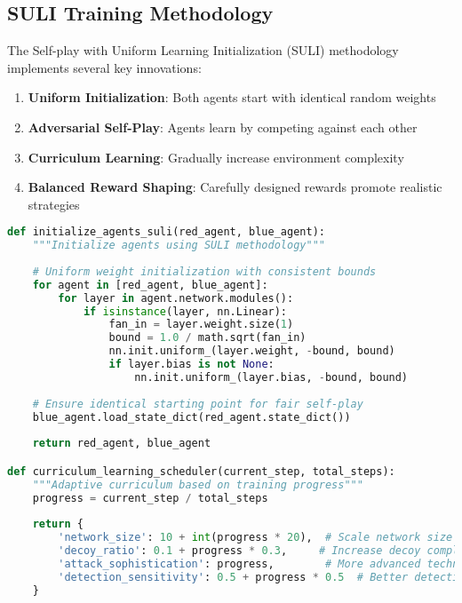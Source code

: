 \documentclass[12pt,a4paper]{article}
\begin{document}
\subsection{SULI Training Methodology}

The Self-play with Uniform Learning Initialization (SULI) methodology implements several key innovations:

\begin{enumerate}
    \item \textbf{Uniform Initialization}: Both agents start with identical random weights
    \item \textbf{Adversarial Self-Play}: Agents learn by competing against each other
    \item \textbf{Curriculum Learning}: Gradually increase environment complexity
    \item \textbf{Balanced Reward Shaping}: Carefully designed rewards promote realistic strategies
\end{enumerate}

\begin{lstlisting}[language=Python, caption=SULI Implementation Details]
def initialize_agents_suli(red_agent, blue_agent):
    """Initialize agents using SULI methodology"""
    
    # Uniform weight initialization with consistent bounds
    for agent in [red_agent, blue_agent]:
        for layer in agent.network.modules():
            if isinstance(layer, nn.Linear):
                fan_in = layer.weight.size(1)
                bound = 1.0 / math.sqrt(fan_in)
                nn.init.uniform_(layer.weight, -bound, bound)
                if layer.bias is not None:
                    nn.init.uniform_(layer.bias, -bound, bound)
    
    # Ensure identical starting point for fair self-play
    blue_agent.load_state_dict(red_agent.state_dict())
    
    return red_agent, blue_agent

def curriculum_learning_scheduler(current_step, total_steps):
    """Adaptive curriculum based on training progress"""
    progress = current_step / total_steps
    
    return {
        'network_size': 10 + int(progress * 20),  # Scale network size
        'decoy_ratio': 0.1 + progress * 0.3,     # Increase decoy complexity
        'attack_sophistication': progress,        # More advanced techniques
        'detection_sensitivity': 0.5 + progress * 0.5  # Better detection
    }
\end{lstlisting}
\end{document}
